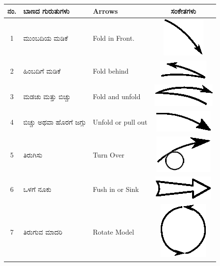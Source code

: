\begin{longtable}[l]{|c|l|l|c|}
\hline
ನಂ.  & ಬಾಣದ ಗುರುತುಗಳು & Arrows & ಸಂಕೇತಗಳು \\[0.1cm]
\hline
1  & ಮುಂಬದಿಯ ಮಡಿಕೆ & Fold in Front. & {\includegraphics[scale=.98]{src/figure/chap1/fig1a_1.eps}}\\[0.1cm]
\hline
2 &ಹಿಂಬದಿಗೆ ಮಡಿಕೆ &  Fold behind & {\includegraphics[scale=.98]{src/figure/chap1/fig1a_2.eps}}\\[0.1cm]
\hline
3 & ಮಡಚು ಮತ್ತು ಬಿಚ್ಚು & Fold and unfold & {\includegraphics[scale=.98]{src/figure/chap1/fig1a_3.eps}}\\[0.1cm]
\hline
4 & ಬಿಚ್ಚು  ಅಥವಾ ಹೊರಗೆ ಜಗ್ಗು & Unfold or pull out & {\includegraphics[scale=.98]{src/figure/chap1/fig1a_4.eps}}\\[0.1cm]
\hline
5 & ತಿರುಗಿಸು & Turn Over & {\includegraphics[scale=.98]{src/figure/chap1/fig1a_5.eps}}\\[0.1cm]
\hline
6 & ಒಳಗೆ ನೂಕು & Fush in or Sink & {\includegraphics[scale=.98]{src/figure/chap1/fig1a_6.eps}}\\[0.1cm]
\hline
7 & ತಿರುಗುವ ಮಾದರಿ &  Rotate Model & {\includegraphics[scale=.98]{src/figure/chap1/fig1a_7.eps}}\\[0.1cm]

\end{longtable}
